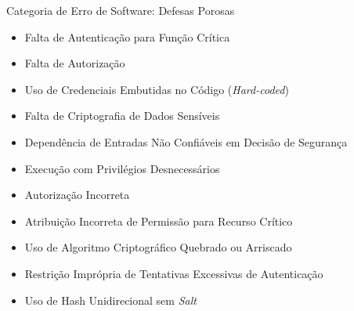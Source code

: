 \begin{frame}{Categoria de Erro de Software: Defesas Porosas}
    \begin{itemize}
        \item Falta de Autenticação para Função Crítica
        \item Falta de Autorização
        \item Uso de Credenciais Embutidas no Código (\textit{Hard-coded})
        \item Falta de Criptografia de Dados Sensíveis
        \item Dependência de Entradas Não Confiáveis em Decisão de Segurança
        \item Execução com Privilégios Desnecessários
        \item Autorização Incorreta
        \item Atribuição Incorreta de Permissão para Recurso Crítico
        \item Uso de Algoritmo Criptográfico Quebrado ou Arriscado
        \item Restrição Imprópria de Tentativas Excessivas de Autenticação
        \item Uso de Hash Unidirecional sem \textit{Salt}
    \end{itemize}
\end{frame}
